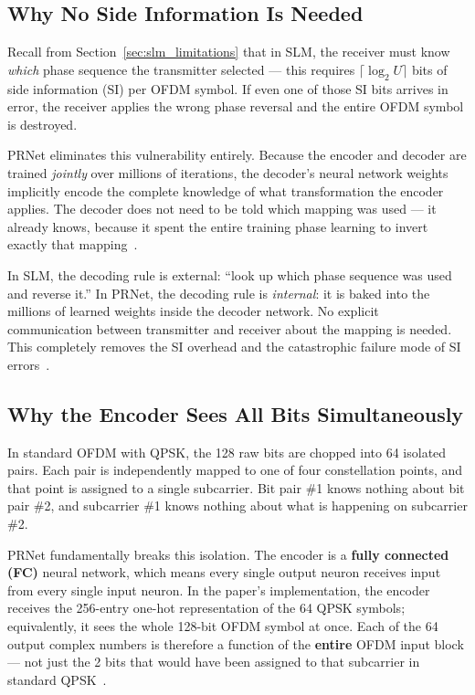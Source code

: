 \subsection{Why No Side Information Is Needed}

Recall from Section~\ref{sec:slm_limitations} that in SLM, the receiver must
know \emph{which} phase sequence the transmitter selected --- this requires
$\lceil\log_2 U\rceil$ bits of side information (SI) per OFDM symbol.
If even one of those SI bits arrives in error, the receiver applies the wrong
phase reversal and the entire OFDM symbol is destroyed.

PRNet eliminates this vulnerability entirely.  Because the encoder and decoder
are trained \emph{jointly} over millions of iterations, the decoder's neural
network weights implicitly encode the complete knowledge of what transformation
the encoder applies.  The decoder does not need to be told which mapping was
used --- it already knows, because it spent the entire training phase learning
to invert exactly that mapping~\cite{kim2017novel}.

\begin{keyinsight}
    In SLM, the decoding rule is external: ``look up which phase sequence was
    used and reverse it.''  In PRNet, the decoding rule is \emph{internal}:
    it is baked into the millions of learned weights inside the decoder network.
    No explicit communication between transmitter and receiver about the
    mapping is needed.  This completely removes the SI overhead and the
    catastrophic failure mode of SI errors~\cite{kim2017novel}.
\end{keyinsight}


\subsection{Why the Encoder Sees All Bits Simultaneously}

In standard OFDM with QPSK, the 128 raw bits are chopped into 64 isolated
pairs.  Each pair is independently mapped to one of four constellation points,
and that point is assigned to a single subcarrier.  Bit pair \#1 knows nothing
about bit pair \#2, and subcarrier \#1 knows nothing about what is happening on
subcarrier \#2.

PRNet fundamentally breaks this isolation.  The encoder is a \textbf{fully
connected (FC)} neural network, which means every single output neuron
receives input from every single input neuron.  In the paper's implementation,
the encoder receives the 256-entry one-hot representation of the 64 QPSK
symbols; equivalently, it sees the whole 128-bit OFDM symbol at once.  Each of
the 64 output complex numbers is therefore a function of the \textbf{entire}
OFDM input block --- not just the 2 bits that would have been assigned to that
subcarrier in standard QPSK~\cite{kim2017novel}.

